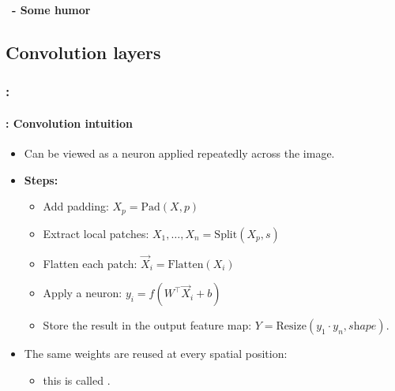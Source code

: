 \documentclass[xcolor=table]{beamer}
\begin{document}
\begin{frame}
	\frametitle{\insertshortsubtitle}
	\framesubtitle{\insertsection\ - Some humor}
	
	
\end{frame}

\subsection{Convolution layers}


\begin{frame}
	\frametitle{\insertshortsubtitle: \insertsection}
	\framesubtitle{\insertsubsection: Convolution intuition}
	
	\begin{itemize}
		
		\item Can be viewed as a neuron applied repeatedly across the image.
		
		\item \textbf{Steps:}
		\begin{itemize}
			\item Add padding: $X_p = \mathrm{Pad}(X, p)$
			
			\item Extract local patches: $X_1,\dots,X_n = \mathrm{Split}(X_p, s)$
			
			\item Flatten each patch: $\vec{X}_i = \mathrm{Flatten}(X_i)$
			
			\item Apply a neuron: $y_i = f(W^\top \vec{X}_i + b)$
			
			\item Store the result in the output feature map: $Y = \text{Resize}(y_1 \cdot y_n, \textit{shape})$.
		\end{itemize}
		
		\item The same weights are reused at every spatial position:
		\begin{itemize}
			\item this is called .
		\end{itemize}
		
	\end{itemize}
	
	\begin{center}
	\end{center}
	
\end{frame}
\end{document}
